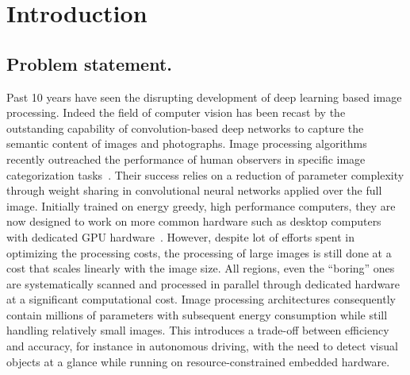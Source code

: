 \section*{Introduction}
\label{sec:intro}
\subsection*{Problem statement.}


Past 10 years have seen the disrupting development of deep learning based image processing. 
Indeed the field of computer vision has been recast by the outstanding capability of convolution-based deep networks to capture the semantic content of images and photographs. Image processing algorithms recently outreached the performance of human observers in specific image categorization tasks~\cite{He15}. Their success relies on a reduction of parameter complexity through weight sharing  in convolutional neural networks applied over the full image. 
Initially trained on energy greedy, high performance computers, they are now designed to work on more common hardware such as desktop computers with dedicated GPU hardware~\cite{Sandler18}.
However, despite lot of efforts spent in optimizing the processing costs, the processing of large images is still done at a cost that scales linearly with the image size. All regions, even the “boring” ones are systematically scanned and processed in parallel through dedicated hardware at a significant computational cost.
Image processing architectures consequently contain millions of parameters with subsequent energy consumption while still handling relatively small images. This introduces a trade-off between efficiency and accuracy, for instance in autonomous driving, with the need to detect visual objects at a glance while running on resource-constrained embedded hardware. 

